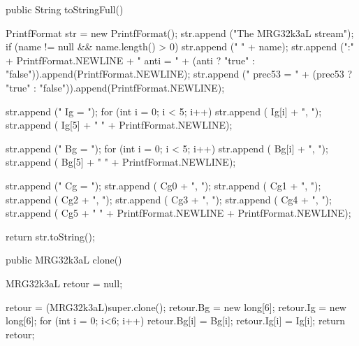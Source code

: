 \fi
\begin{htmlonly}
\end{htmlonly}
\begin{code}

   public String toStringFull() \begin{hide} {
      PrintfFormat str = new PrintfFormat();
      str.append ("The MRG32k3aL stream");
      if (name != null && name.length() > 0)
         str.append (" " + name);
      str.append (":" + PrintfFormat.NEWLINE + "   anti = " +
         (anti ? "true" : "false")).append(PrintfFormat.NEWLINE);
      str.append ("   prec53 = " + (prec53 ? "true" : "false")).append(PrintfFormat.NEWLINE);

      str.append ("   Ig = { ");
      for (int i = 0; i < 5; i++)
         str.append ( Ig[i] + ", ");
      str.append ( Ig[5] + " }" + PrintfFormat.NEWLINE);

      str.append ("   Bg = { ");
      for (int i = 0; i < 5; i++)
         str.append ( Bg[i] + ", ");
      str.append ( Bg[5] + " }" + PrintfFormat.NEWLINE);

      str.append ("   Cg = { ");
      str.append ( Cg0 + ", ");
      str.append ( Cg1 + ", ");
      str.append ( Cg2 + ", ");
      str.append ( Cg3 + ", ");
      str.append ( Cg4 + ", ");
      str.append ( Cg5 + " }" + PrintfFormat.NEWLINE +
          PrintfFormat.NEWLINE);

      return str.toString();
   }\end{hide}
\end{code}
\iffalse
 \begin{tabb} Returns a string containing the name of this stream and the
   values of all its internal variables.
 \end{tabb}
\fi
\begin{htmlonly}
\end{htmlonly}
\begin{code}

   public MRG32k3aL clone() \begin{hide} {
      MRG32k3aL retour = null;

      retour = (MRG32k3aL)super.clone();
      retour.Bg = new long[6];
      retour.Ig = new long[6];
      for (int i = 0; i<6; i++) {
         retour.Bg[i] = Bg[i];
         retour.Ig[i] = Ig[i];
      }
      return retour;
   }\end{hide}
\end{code}
